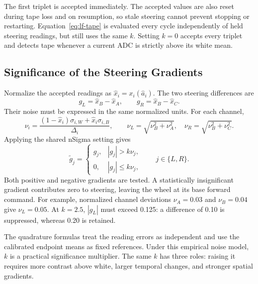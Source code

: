 The first triplet is accepted immediately. The accepted values are also reset during tape loss and on resumption, so stale steering cannot prevent stopping or restarting. Equation~\eqref{eq:lf-tape} is evaluated every cycle independently of held steering readings, but still uses the same $k$. Setting $k=0$ accepts every triplet and detects tape whenever a current ADC is strictly above its white mean.

\subsection{Significance of the Steering Gradients}
Normalize the accepted readings as $\widehat x_i=x_i(\widehat a_i)$. The two steering differences are
\begin{equation}
g_L=\widehat x_B-\widehat x_A,\qquad
g_R=\widehat x_B-\widehat x_C.
\label{eq:lf-gradients}
\end{equation}
Their noise must be expressed in the same normalized units. For each channel,
\begin{equation}
\nu_i=\frac{(1-\widehat x_i)\sigma_{i,W}+\widehat x_i\sigma_{i,B}}{\Delta_i},
\qquad
\nu_L=\sqrt{\nu_B^2+\nu_A^2},\quad
\nu_R=\sqrt{\nu_B^2+\nu_C^2}.
\label{eq:lf-gradient-noise}
\end{equation}
Applying the shared nSigma setting gives
\begin{equation}
\widetilde g_j=
\begin{cases}
g_j,& |g_j|>k\nu_j,\\
0,& |g_j|\le k\nu_j,
\end{cases}
\qquad j\in\{L,R\}.
\label{eq:lf-gradient-gate}
\end{equation}
Both positive and negative gradients are tested. A statistically insignificant gradient contributes zero to steering, leaving the wheel at its base forward command. For example, normalized channel deviations $\nu_A=0.03$ and $\nu_B=0.04$ give $\nu_L=0.05$. At $k=2.5$, $|g_L|$ must exceed 0.125: a difference of 0.10 is suppressed, whereas 0.20 is retained.

The quadrature formulas treat the reading errors as independent and use the calibrated endpoint means as fixed references. Under this empirical noise model, $k$ is a practical significance multiplier. The same $k$ has three roles: raising it requires more contrast above white, larger temporal changes, and stronger spatial gradients.

